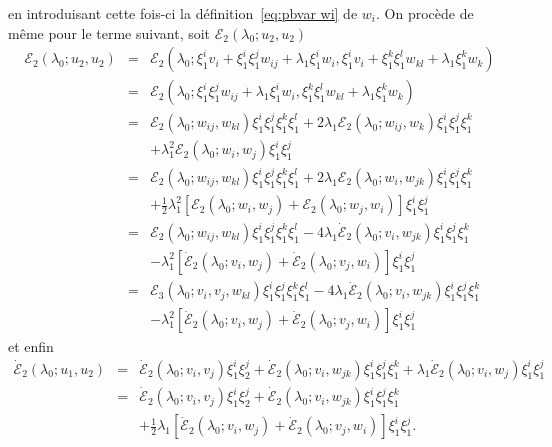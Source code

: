 \documentclass{article}
\newcommand{\nocomma}{}
\newcommand{\nosymbol}{}
\begin{document}
en introduisant cette fois-ci la d{\'e}finition~\eqref{eq:pbvar wi} de $w_i .$
On proc{\`e}de de m{\^e}me pour le terme suivant, soit $\mathcal{E}_2
(\lambda_0 ; u_2, u_2)$
\begin{eqnarray*}
  \mathcal{E}_2 (\lambda_0 ; u_2, u_2) & = & \mathcal{E}_2 (\lambda_0 ;
  \xi_1^i v_i + \xi_1^i \xi_1^j w_{i \nocomma j} + \lambda_1 \xi_1^i w_i,
  \xi_1^i v_i + \xi_1^k \xi_1^l w_{k \nocomma l} + \lambda_1 \xi_1^k w_k)\\
  & = & \mathcal{E}_2 (\lambda_0 ; \xi_1^i \xi_1^j w_{i \nocomma j} +
  \lambda_1 \xi_1^i w_i, \xi_1^k \xi_1^l w_{k \nocomma l} + \lambda_1 \xi_1^k
  w_k)\\
  & = & \mathcal{E}_2 (\lambda_0 ; w_{i \nocomma j}, w_{k \nocomma l})
  \xi_1^i \xi_1^j \xi_1^k \xi_1^l + 2 \lambda_1 \mathcal{E}_2 (\lambda_0 ;
  w_{i \nocomma j}, w_k) \xi_1^i \xi_1^j \xi_1^k\\
  &  & \nosymbol + \lambda_1^2 \mathcal{E}_2 (\lambda_0 ; w_i, w_j) \xi_1^i
  \xi_1^j\\
  & = & \mathcal{E}_2 (\lambda_0 ; w_{i \nocomma j}, w_{k \nocomma l})
  \xi_1^i \xi_1^j \xi_1^k \xi_1^l + 2 \lambda_1 \mathcal{E}_2 (\lambda_0 ;
  w_i, w_{j \nocomma k}) \xi_1^i \xi_1^j \xi_1^k\\
  &  & \nosymbol + \tfrac{1}{2} \lambda_1^2  [\mathcal{E}_2 (\lambda_0 ; w_i,
  w_j) +\mathcal{E}_2 (\lambda_0 ; w_j, w_i)] \xi_1^i \xi_1^j\\
  & = & \mathcal{E}_2 (\lambda_0 ; w_{i \nocomma j}, w_{k \nocomma l})
  \xi_1^i \xi_1^j \xi_1^k \xi_1^l - 4 \lambda_1  \dot{\mathcal{E}}_2
  (\lambda_0 ; v_i, w_{j \nocomma k}) \xi_1^i \xi_1^j \xi_1^k\\
  &  & \nosymbol - \lambda_1^2  [\dot{\mathcal{E}}_2 (\lambda_0 ; v_i, w_j) +
  \dot{\mathcal{E}}_2 (\lambda_0 ; v_j, w_i)] \xi_1^i \xi_1^j\\
  & = & \mathcal{E}_3 (\lambda_0 ; v_i, v_j, w_{k \nocomma l}) \xi_1^i
  \xi_1^j \xi_1^k \xi_1^l - 4 \lambda_1  \dot{\mathcal{E}}_2 (\lambda_0 ; v_i,
  w_{j \nocomma k}) \xi_1^i \xi_1^j \xi_1^k\\
  &  & \nosymbol - \lambda_1^2  [\dot{\mathcal{E}}_2 (\lambda_0 ; v_i, w_j) +
  \dot{\mathcal{E}}_2 (\lambda_0 ; v_j, w_i)] \xi_1^i \xi_1^j
\end{eqnarray*}
et enfin
\begin{eqnarray*}
  \dot{\mathcal{E}}_2 (\lambda_0 ; u_1, u_2) & = & \dot{\mathcal{E}}_2
  (\lambda_0 ; v_i, v_j) \xi_1^i \xi_2^j + \dot{\mathcal{E}}_2 (\lambda_0 ;
  v_i, w_{j \nocomma k}) \xi_1^i \xi_1^j \xi_1^k + \lambda_1
  \dot{\mathcal{E}}_2 (\lambda_0 ; v_i, w_j) \xi_1^i \xi_1^j\\
  & = & \dot{\mathcal{E}}_2 (\lambda_0 ; v_i, v_j) \xi_1^i \xi_2^j +
  \dot{\mathcal{E}}_2 (\lambda_0 ; v_i, w_{j \nocomma k}) \xi_1^i \xi_1^j
  \xi_1^k\\
  &  & \nosymbol + \tfrac{1}{2} \lambda_1  [\dot{\mathcal{E}}_2 (\lambda_0 ;
  v_i, w_j) + \dot{\mathcal{E}}_2 (\lambda_0 ; v_j, w_i)] \xi_1^i \xi_1^j .
\end{eqnarray*}
\end{document}
